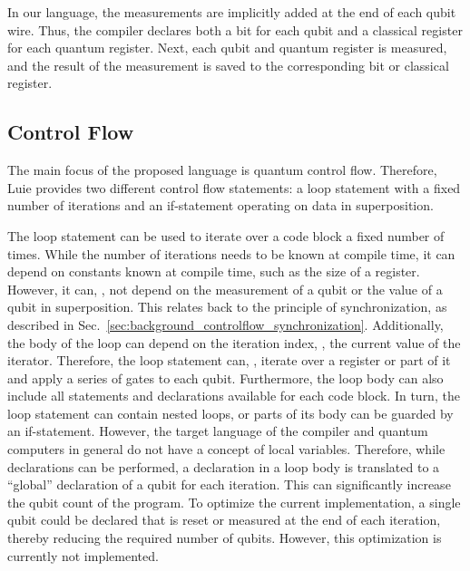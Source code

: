 In our language, the measurements are implicitly added at the end of each qubit wire. Thus, the compiler declares both a bit for each qubit and a classical register for each quantum register. Next, each qubit and quantum register is measured, and the result of the measurement is saved to the corresponding bit or classical register.

\subsection{Control Flow}
\label{sec:concept_controlFlow}
The main focus of the proposed language is quantum control flow. Therefore, Luie provides two different control flow statements: a loop statement with a fixed number of iterations and an if-statement operating on data in superposition. 

The loop statement can be used to iterate over a code block a fixed number of times. While the number of iterations needs to be known at compile time, it can depend on constants known at compile time, such as the size of a register. However, it can, \eg, not depend on the measurement of a qubit or the value of a qubit in superposition. This relates back to the principle of synchronization, as described in Sec.~\ref{sec:background_controlflow_synchronization}. Additionally, the body of the loop can depend on the iteration index, \ie, the current value of the iterator. Therefore, the loop statement can, \eg, iterate over a register or part of it and apply a series of gates to each qubit. Furthermore, the loop body can also include all statements and declarations available for each code block. In turn, the loop statement can contain nested loops, or parts of its body can be guarded by an if-statement. However, the target language of the compiler and quantum computers in general do not have a concept of local variables. Therefore, while declarations can be performed, a declaration in a loop body is translated to a ``global'' declaration of a qubit for each iteration. This can significantly increase the qubit count of the program. To optimize the current implementation, a single qubit could be declared that is reset or measured at the end of each iteration, thereby reducing the required number of qubits. However, this optimization is currently not implemented.

